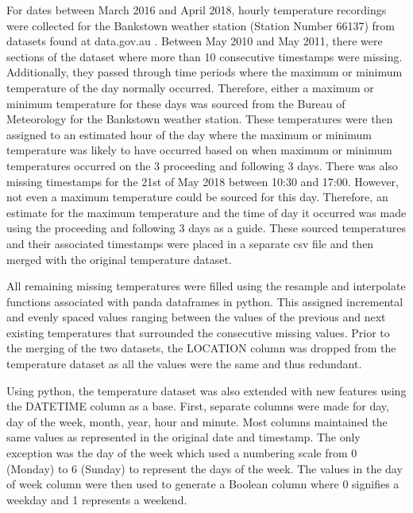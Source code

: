\documentclass[mstat,12pt]{unswthesis}
\begin{document}
For dates between March 2016 and April 2018, hourly temperature
recordings were collected for the Bankstown weather station (Station
Number 66137) from datasets found at data.gov.au \cite{DATAGOV}. Between
May 2010 and May 2011, there were sections of the dataset where more
than 10 consecutive timestamps were missing. Additionally, they passed
through time periods where the maximum or minimum temperature of the day
normally occurred. Therefore, either a maximum or minimum temperature
for these days was sourced from the Bureau of Meteorology \cite{BOM} for
the Bankstown weather station. These temperatures were then assigned to
an estimated hour of the day where the maximum or minimum temperature
was likely to have occurred based on when maximum or minimum
temperatures occurred on the 3 proceeding and following 3 days. There
was also missing timestamps for the 21st of May 2018 between 10:30 and
17:00. However, not even a maximum temperature could be sourced for this
day. Therefore, an estimate for the maximum temperature and the time of
day it occurred was made using the proceeding and following 3 days as a
guide. These sourced temperatures and their associated timestamps were
placed in a separate csv file and then merged with the original
temperature dataset.

\bigskip

All remaining missing temperatures were filled using the resample and
interpolate functions associated with panda dataframes in python. This
assigned incremental and evenly spaced values ranging between the values
of the previous and next existing temperatures that surrounded the
consecutive missing values. Prior to the merging of the two datasets,
the LOCATION column was dropped from the temperature dataset as all the
values were the same and thus redundant.

\bigskip

Using python, the temperature dataset was also extended with new
features using the DATETIME column as a base. First, separate columns
were made for day, day of the week, month, year, hour and minute. Most
columns maintained the same values as represented in the original date
and timestamp. The only exception was the day of the week which used a
numbering scale from 0 (Monday) to 6 (Sunday) to represent the days of
the week. The values in the day of week column were then used to
generate a Boolean column where 0 signifies a weekday and 1 represents a
weekend.

\bigskip
\end{document}
